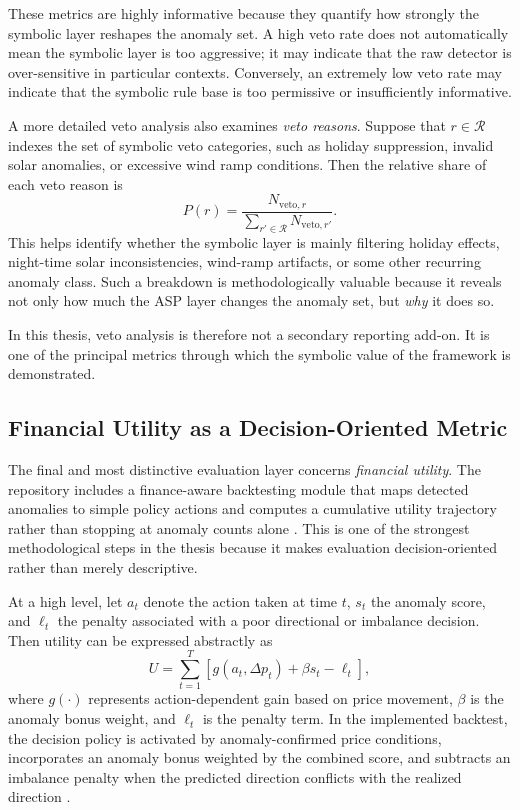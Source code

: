 These metrics are highly informative because they quantify how strongly the symbolic layer reshapes the anomaly set. A high veto rate does not automatically mean the symbolic layer is too aggressive; it may indicate that the raw detector is over-sensitive in particular contexts. Conversely, an extremely low veto rate may indicate that the symbolic rule base is too permissive or insufficiently informative.

A more detailed veto analysis also examines \emph{veto reasons}. Suppose that $r \in \mathcal{R}$ indexes the set of symbolic veto categories, such as holiday suppression, invalid solar anomalies, or excessive wind ramp conditions. Then the relative share of each veto reason is
\begin{equation}
	P(r) =
	\frac{N_{\mathrm{veto},r}}{\sum_{r' \in \mathcal{R}} N_{\mathrm{veto},r'}}.
	\label{eq:veto_reason_share}
\end{equation}
This helps identify whether the symbolic layer is mainly filtering holiday effects, night-time solar inconsistencies, wind-ramp artifacts, or some other recurring anomaly class. Such a breakdown is methodologically valuable because it reveals not only how much the ASP layer changes the anomaly set, but \emph{why} it does so.

In this thesis, veto analysis is therefore not a secondary reporting add-on. It is one of the principal metrics through which the symbolic value of the framework is demonstrated.

\subsection{Financial Utility as a Decision-Oriented Metric}

The final and most distinctive evaluation layer concerns \emph{financial utility}. The repository includes a finance-aware backtesting module that maps detected anomalies to simple policy actions and computes a cumulative utility trajectory rather than stopping at anomaly counts alone \cite{repo_thesis_grid_anomaly}. This is one of the strongest methodological steps in the thesis because it makes evaluation decision-oriented rather than merely descriptive.

At a high level, let $a_t$ denote the action taken at time $t$, $s_t$ the anomaly score, and $\ell_t$ the penalty associated with a poor directional or imbalance decision. Then utility can be expressed abstractly as
\begin{equation}
	U =
	\sum_{t=1}^{T}
	\left[
	g(a_t, \Delta p_t)
	+ \beta s_t
	- \ell_t
	\right],
	\label{eq:utility_general}
\end{equation}
where $g(\cdot)$ represents action-dependent gain based on price movement, $\beta$ is the anomaly bonus weight, and $\ell_t$ is the penalty term. In the implemented backtest, the decision policy is activated by anomaly-confirmed price conditions, incorporates an anomaly bonus weighted by the combined score, and subtracts an imbalance penalty when the predicted direction conflicts with the realized direction \cite{repo_thesis_grid_anomaly}.

